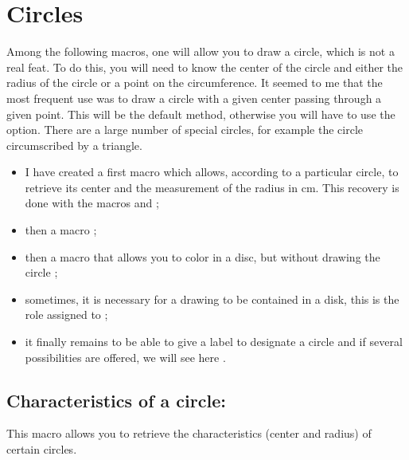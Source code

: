 \newpage
\section{Circles}

Among the following macros, one will allow you to draw a circle, which is not a real feat. To do this, you will need to know the center of the circle and either the radius of the circle or a point on the circumference. It seemed to me that the most frequent use was to draw a circle with a given center passing through a given point. This will be the default method, otherwise you will have to use the  option. There are a large number of special circles, for example the circle circumscribed by a triangle.

\begin{itemize}
  \item  I have created a first macro  which allows, according to a particular circle, to retrieve its center and the measurement of the radius in cm. This recovery is done with the macros  and ;
 
 \item then a macro ;
 
 \item then a macro that allows you to color in a disc, but without drawing the circle ;
 
 \item sometimes, it is necessary for a drawing to be contained in a disk, this is the role assigned to ;
  
 \item  it finally remains to be able to give a label to designate a circle and if several possibilities are offered, we will see here .
\end{itemize} 

\subsection{Characteristics of a circle: }
 
This macro allows you to retrieve the characteristics (center and radius) of certain circles.

